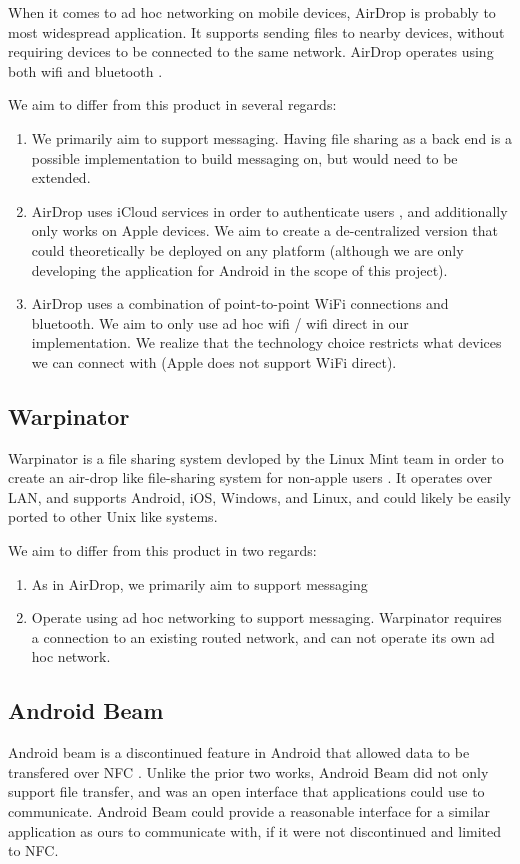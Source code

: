 \documentclass[10pt]{article}
\begin{document}
When it comes to ad hoc networking on mobile devices, AirDrop is probably to most widespread application. It supports sending files to nearby devices, without
requiring devices to be connected to the same network. AirDrop operates using both wifi and bluetooth \cite{AppleSupport}.

We aim to differ from this product in several regards:
\begin{enumerate}
    \item We primarily aim to support messaging. Having file sharing as a back end is a possible implementation to build messaging on, but would need to be extended.
    \item AirDrop uses iCloud services in order to authenticate users \cite{AppleSupportSecurity}, and additionally only works on Apple devices. We aim to create a de-centralized version that
          could theoretically be deployed on any platform (although we are only developing the application for Android in the scope of this project).
    \item AirDrop uses a combination of point-to-point WiFi connections and bluetooth. We aim to only use ad hoc wifi / wifi direct in our implementation. We realize
          that the technology choice restricts what devices we can connect with (Apple does not support WiFi direct).
\end{enumerate}

\subsection{Warpinator}

Warpinator is a file sharing system devloped by the Linux Mint team in order to create an air-drop like file-sharing system for non-apple users  \cite{Webster2023linuxmint}. It operates over
LAN, and supports Android, iOS, Windows, and Linux, and could likely be easily ported to other Unix like systems.

We aim to differ from this product in two regards:
\begin{enumerate}
    \item As in AirDrop, we primarily aim to support messaging
    \item Operate using ad hoc networking to support messaging. Warpinator requires a connection to an existing routed network, and can not operate its own ad hoc
          network.
\end{enumerate}

\subsection{Android Beam}
Android beam is a discontinued \cite{Cantisano_2022} feature in Android that allowed data to be transfered over NFC \cite{AndroidDevelopers}. Unlike the prior two works, Android Beam did not only support file
transfer, and was an open interface that applications could use to communicate. Android Beam could provide a reasonable interface for a similar application as ours
to communicate with, if it were not discontinued and limited to NFC.
\end{document}
